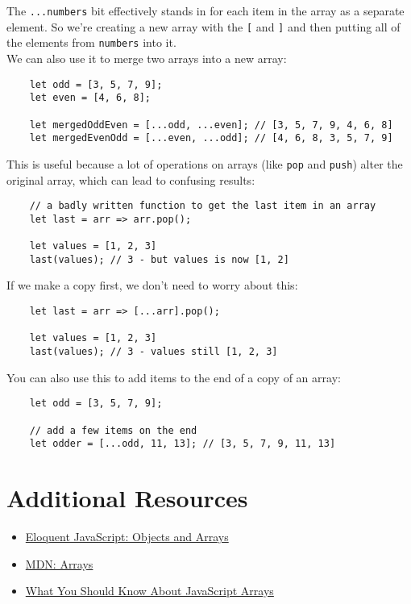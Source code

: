 The \texttt{...numbers} bit effectively stands in for each item in the array as a separate element. So we're creating a new array with the \texttt{[} and \texttt{]} and then putting all of the elements from \texttt{numbers} into it.
\\


We can also use it to merge two arrays into a new array:

\begin{verbatim}
    let odd = [3, 5, 7, 9];
    let even = [4, 6, 8];

    let mergedOddEven = [...odd, ...even]; // [3, 5, 7, 9, 4, 6, 8]
    let mergedEvenOdd = [...even, ...odd]; // [4, 6, 8, 3, 5, 7, 9]
\end{verbatim}

This is useful because a lot of operations on arrays (like \texttt{pop} and \texttt{push}) alter the original array, which can lead to confusing results:

\begin{verbatim}
    // a badly written function to get the last item in an array
    let last = arr => arr.pop();

    let values = [1, 2, 3]
    last(values); // 3 - but values is now [1, 2]
\end{verbatim}

\pagebreak

If we make a copy first, we don't need to worry about this:

\begin{verbatim}
    let last = arr => [...arr].pop();

    let values = [1, 2, 3]
    last(values); // 3 - values still [1, 2, 3]
\end{verbatim}

You can also use this to add items to the end of a copy of an array:

\begin{verbatim}
    let odd = [3, 5, 7, 9];

    // add a few items on the end
    let odder = [...odd, 11, 13]; // [3, 5, 7, 9, 11, 13]
\end{verbatim}

\section{Additional Resources}

\begin{itemize}[leftmargin=*]
    \item \href{https://eloquentjavascript.net/04_data.html}{Eloquent JavaScript: Objects and Arrays}
    \item \href{https://developer.mozilla.org/en-US/docs/Web/JavaScript/Reference/Global_Objects/Array}{MDN: Arrays}
    \item \href{https://thomlom.dev/what-you-should-know-about-js-arrays/}{What You Should Know About JavaScript Arrays}
\end{itemize}
